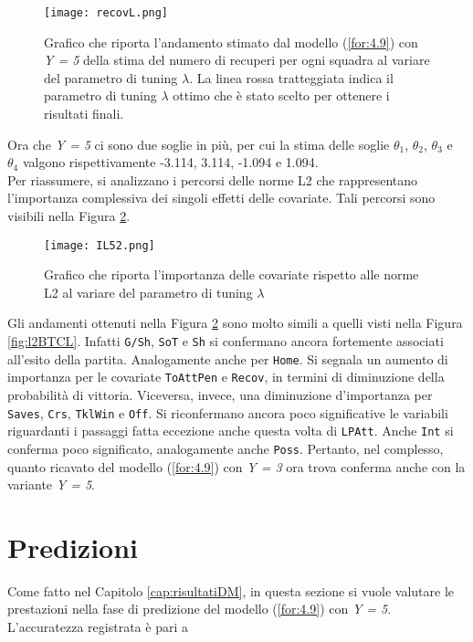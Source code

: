 \begin{figure}[htbp]
	\begin{center}
		\texttt{[image: recovL.png]}
		\caption{Grafico che riporta l'andamento stimato dal modello (\ref{for:4.9}) con \emph{Y = 5} della stima del numero di recuperi per ogni squadra al variare del parametro di tuning $\lambda$. La linea rossa tratteggiata indica il parametro di tuning $\lambda$ ottimo che è stato scelto per ottenere i risultati finali.} \label{fig:recovL5}
	\end{center}
\end{figure}
Ora che \emph{Y = 5} ci sono due soglie in più, per cui la stima delle soglie $\theta_1$, $\theta_2$, $\theta_3$ e $\theta_4$ valgono rispettivamente -3.114, 3.114, -1.094 e 1.094.\\
Per riassumere, si analizzano i percorsi delle norme L2 che rappresentano l'importanza complessiva dei singoli effetti delle covariate. Tali percorsi sono visibili nella Figura \ref{fig:IL52}.
\begin{figure}[]
	\begin{center}
		\texttt{[image: IL52.png]}
		\caption{Grafico che riporta l'importanza delle covariate rispetto alle norme L2 al variare del parametro di tuning $\lambda$} \label{fig:IL52}
	\end{center}
\end{figure}
Gli andamenti ottenuti nella Figura \ref{fig:IL52} sono molto simili a quelli visti nella Figura \ref{fig:l2BTCL}. Infatti \texttt{G/Sh}, \texttt{SoT} e \texttt{Sh} si confermano ancora fortemente associati all'esito della partita. Analogamente anche per \texttt{Home}. Si segnala un aumento di importanza per le covariate \texttt{ToAttPen} e \texttt{Recov}, in termini di diminuzione della probabilità di vittoria. Viceversa, invece, una diminuzione d'importanza per \texttt{Saves}, \texttt{Crs}, \texttt{TklWin} e \texttt{Off}. Si riconfermano ancora poco significative le variabili riguardanti i passaggi fatta eccezione anche questa volta di \texttt{LPAtt}. Anche \texttt{Int} si conferma poco significato, analogamente anche \texttt{Poss}.
Pertanto, nel complesso, quanto ricavato del modello (\ref{for:4.9}) con \emph{Y = 3} ora trova conferma anche con la variante \emph{Y = 5}.
\section{Predizioni}
Come fatto nel Capitolo \ref{cap:risultatiDM}, in questa sezione si vuole valutare le prestazioni nella fase di predizione del modello (\ref{for:4.9}) con \emph{Y = 5}. L'accuratezza registrata è pari a


